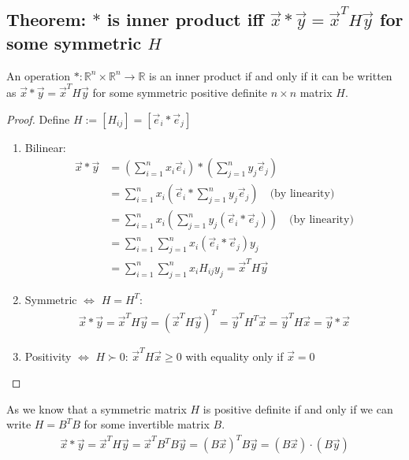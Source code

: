 \documentclass[11pt]{elegantbook}
\begin{document}
\subsection{Theorem: $*$ is inner product iff $\vec{x}*\vec{y}=\vec{x}^T H \vec{y}$ for some symmetric $H$}
\begin{theorem}
    An operation $*: \mathbb{R}^n\times \mathbb{R}^n \rightarrow  \mathbb{R}$ is an inner product if and only if it can be written as $\vec{x}*\vec{y}=\vec{x}^T H \vec{y}$ for some symmetric positive definite $n\times n$ matrix $H$.
\end{theorem}
\begin{proof}
Define $H:=[H_{ij}]=[\vec{e}_i*\vec{e}_j]$
\begin{enumerate}
    \item Bilinear:
    \begin{equation}
        \begin{aligned}
            \vec{x}*\vec{y}&=\left(\sum_{i=1}^nx_i \vec{e}_i\right)*\left(\sum_{j=1}^ny_j \vec{e}_j\right)\\
            &=\sum_{i=1}^nx_i\left(\vec{e}_i*\sum_{j=1}^ny_j \vec{e}_j\right)\quad \text{(by linearity)}\\
            &=\sum_{i=1}^nx_i\left(\sum_{j=1}^ny_j(\vec{e}_i* \vec{e}_j)\right)\quad \text{(by linearity)}\\
            &=\sum_{i=1}^n\sum_{j=1}^nx_i\left(\vec{e}_i* \vec{e}_j\right)y_j\\
            &=\sum_{i=1}^n\sum_{j=1}^nx_iH_{ij}y_j
            =\vec{x}^T H \vec{y}
        \end{aligned}
        \nonumber
    \end{equation}
    \item Symmetric $\Leftrightarrow$ $H=H^T$:
    \begin{equation}
        \begin{aligned}
            \vec{x}* \vec{y}=\vec{x}^TH \vec{y}=\left(\vec{x}^T H \vec{y}\right)^T= \vec{y}^T H^T \vec{x}= \vec{y}^T H \vec{x}=\vec{y}* \vec{x}
        \end{aligned}
        \nonumber
    \end{equation}
    \item Positivity $\Leftrightarrow$ $H\succ 0$: $\vec{x}^T H \vec{x}\geq 0$ with equality only if $\vec{x}=0$
\end{enumerate}
\end{proof}
As we know that a symmetric matrix $H$ is positive definite if and only if we can write $H=B^TB$ for some invertible matrix $B$.
\begin{equation}
    \begin{aligned}
        \vec{x}*\vec{y}=\vec{x}^T H \vec{y}=\vec{x}^T B^T B \vec{y}=(B \vec{x})^T B \vec{y}=(B \vec{x})\cdot (B \vec{y})
    \end{aligned}
    \nonumber
\end{equation}
\end{document}
